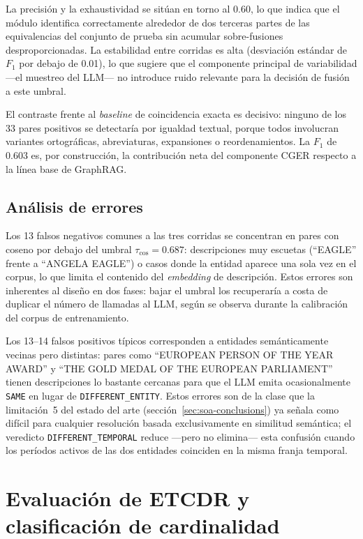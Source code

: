 La precisión y la exhaustividad se sitúan en torno al 0.60, lo que indica que el módulo identifica correctamente alrededor de dos terceras partes de las equivalencias del conjunto de prueba sin acumular sobre-fusiones desproporcionadas. La estabilidad entre corridas es alta (desviación estándar de $F_1$ por debajo de 0.01), lo que sugiere que el componente principal de variabilidad ---el muestreo del LLM--- no introduce ruido relevante para la decisión de fusión a este umbral.

El contraste frente al \emph{baseline} de coincidencia exacta es decisivo: ninguno de los 33 pares positivos se detectaría por igualdad textual, porque todos involucran variantes ortográficas, abreviaturas, expansiones o reordenamientos. La $F_1$ de $0.603$ es, por construcción, la contribución neta del componente CGER respecto a la línea base de GraphRAG.

\subsection{Análisis de errores}

Los 13 falsos negativos comunes a las tres corridas se concentran en pares con coseno por debajo del umbral $\tau_{\cos}=0.687$: descripciones muy escuetas (``EAGLE'' frente a ``ANGELA EAGLE'') o casos donde la entidad aparece una sola vez en el corpus, lo que limita el contenido del \emph{embedding} de descripción. Estos errores son inherentes al diseño en dos fases: bajar el umbral los recuperaría a costa de duplicar el número de llamadas al LLM, según se observa durante la calibración del corpus de entrenamiento.

Los 13--14 falsos positivos típicos corresponden a entidades semánticamente vecinas pero distintas: pares como ``EUROPEAN PERSON OF THE YEAR AWARD'' y ``THE GOLD MEDAL OF THE EUROPEAN PARLIAMENT'' tienen descripciones lo bastante cercanas para que el LLM emita ocasionalmente \texttt{SAME} en lugar de \texttt{DIFFERENT\_ENTITY}. Estos errores son de la clase que la limitación~5 del estado del arte (sección~\ref{sec:soa-conclusions}) ya señala como difícil para cualquier resolución basada exclusivamente en similitud semántica; el veredicto \texttt{DIFFERENT\_TEMPORAL} reduce ---pero no elimina--- esta confusión cuando los períodos activos de las dos entidades coinciden en la misma franja temporal.

\section{Evaluación de ETCDR y clasificación de cardinalidad}\label{sec:eval-etcdr}

